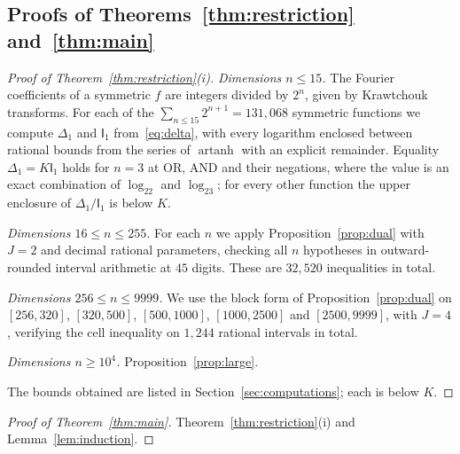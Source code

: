\documentclass[11pt]{amsart}
\theoremstyle{definition}
\theoremstyle{remark}
\newcommand{\I}{\mathsf I}
\begin{document}
\subsection{Proofs of Theorems~\ref{thm:restriction} and~\ref{thm:main}}
\begin{proof}[Proof of Theorem~\ref{thm:restriction}(i)]
\emph{Dimensions $n\le15$.} The Fourier coefficients of a symmetric $f$ are integers divided by $2^n$, given by Krawtchouk transforms. For each of the $\sum_{n\le15}2^{n+1}=131{,}068$ symmetric functions we compute $\Delta_1$ and $\I_1$ from~\eqref{eq:delta}, with every logarithm enclosed between rational bounds from the series of $\operatorname{artanh}$ with an explicit remainder. Equality $\Delta_1=K\I_1$ holds for $n=3$ at OR, AND and their negations, where the value is an exact combination of $\log_22$ and $\log_23$; for every other function the upper enclosure of $\Delta_1/\I_1$ is below $K$.

\emph{Dimensions $16\le n\le255$.} For each $n$ we apply Proposition~\ref{prop:dual} with $J=2$ and decimal rational parameters, checking all $n$ hypotheses in outward-rounded interval arithmetic at $45$ digits. These are $32{,}520$ inequalities in total.

\emph{Dimensions $256\le n\le9999$.} We use the block form of Proposition~\ref{prop:dual} on $[256,320]$, $[320,500]$, $[500,1000]$, $[1000,2500]$ and $[2500,9999]$, with $J=4$, verifying the cell inequality on $1{,}244$ rational intervals in total.

\emph{Dimensions $n\ge10^4$.} Proposition~\ref{prop:large}.

The bounds obtained are listed in Section~\ref{sec:computations}; each is below $K$.
\end{proof}

\begin{proof}[Proof of Theorem~\ref{thm:main}]
Theorem~\ref{thm:restriction}(i) and Lemma~\ref{lem:induction}.
\end{proof}
\end{document}
